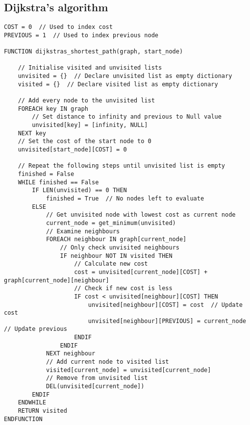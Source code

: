 \documentclass[a4paper,11pt]{article}
\begin{document}
\subsection{Dijkstra's algorithm}
\begin{Verbatim}[breaklines=true, breakanywhere=true]
COST = 0  // Used to index cost
PREVIOUS = 1  // Used to index previous node

FUNCTION dijkstras_shortest_path(graph, start_node)
    
    // Initialise visited and unvisited lists
    unvisited = {}  // Declare unvisited list as empty dictionary    
    visited = {}  // Declare visited list as empty dictionary 

    // Add every node to the unvisited list
    FOREACH key IN graph
        // Set distance to infinity and previous to Null value
        unvisited[key] = [infinity, NULL]  
    NEXT key
    // Set the cost of the start node to 0 
    unvisited[start_node][COST] = 0    
    
    // Repeat the following steps until unvisited list is empty
    finished = False
    WHILE finished == False
        IF LEN(unvisited) == 0 THEN
            finished = True  // No nodes left to evaluate
        ELSE
            // Get unvisited node with lowest cost as current node
            current_node = get_minimum(unvisited) 
            // Examine neighbours
            FOREACH neighbour IN graph[current_node] 
                // Only check unvisited neighbours
                IF neighbour NOT IN visited THEN
                    // Calculate new cost
                    cost = unvisited[current_node][COST] + graph[current_node][neighbour] 
                    // Check if new cost is less
                    IF cost < unvisited[neighbour][COST] THEN
                        unvisited[neighbour][COST] = cost  // Update cost  
                        unvisited[neighbour][PREVIOUS] = current_node  // Update previous
                    ENDIF
                ENDIF
            NEXT neighbour
            // Add current node to visited list
            visited[current_node] = unvisited[current_node] 
            // Remove from unvisited list
            DEL(unvisited[current_node])
        ENDIF
    ENDWHILE
    RETURN visited
ENDFUNCTION
\end{Verbatim}
\end{document}
